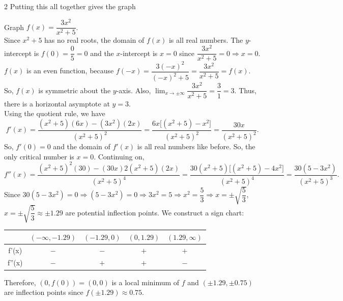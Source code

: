\documentclass{book}
\begin{document}
\begin{Exam}
\begin{multicols}{2}
Putting this all together gives the graph

\begin{center}
\end{center}
\end{multicols}
\end{Exam}\vs

\begin{Exam} Graph $f(x) = \dfrac{3x^2}{x^2+5}$.\\

Since $x^2+5$ has no real roots, the domain of $f(x)$ is all real numbers. The $y$-intercept is $f(0) = \dfrac{0}{5} = 0$ and the $x$-intercept is $x = 0$ since $\dfrac{3x^2}{x^2+5} = 0 \Rightarrow x=0$. $f(x)$ is an even function, because $f(-x) = \dfrac{3(-x)^2}{(-x)^2+5} = \dfrac{3x^2}{x^2+5} = f(x)$. So, $f(x)$ is symmetric about the $y$-axis. Also, $\displaystyle\lim_{x\to \pm\infty} \dfrac{3x^2}{x^2+5} = \dfrac{3}{1} = 3$. Thus, there is a horizontal asymptote at $y=3$.\\

Using the quotient rule, we have \[f'(x) = \dfrac{(x^2+5)(6x) - (3x^2)(2x)}{(x^2+5)^2} = \dfrac{6x\big[(x^2+5) - x^2\big]}{(x^2+5)^2} = \dfrac{30x}{(x^2+5)^2}.\] So, $f'(0) = 0$ and the domain of $f'(x)$ is all real numbers like before. So, the only critical number is $x = 0$. Continuing on, \[f''(x) = \dfrac{(x^2+5)^2(30) - (30x)2(x^2+5)(2x)}{(x^2+5)^4} = \dfrac{30(x^2+5)\big[(x^2+5)-4x^2\big]}{(x^2+5)^4} = \dfrac{30(5-3x^2)}{(x^2+5)^3}.\] Since $30(5-3x^2) = 0 \Rightarrow (5-3x^2) = 0 \Rightarrow 3x^2 = 5 \Rightarrow x^2 = \dfrac{5}{3} \Rightarrow x = \pm\sqrt{\dfrac{5}{3}}$,\; $x = \pm\sqrt{\dfrac{5}{3}} \approx \pm 1.29$ are potential inflection points. We construct a sign chart:

\begin{center}
\begin{tabular}{c|c|c|c|c}

 & $(-\infty, -1.29)$ & $(-1.29, 0)$ & $(0, 1.29)$ & $(1.29, \infty)$ \\ \hline
f'(x) & $-$ & $-$ & $+$ & $+$ \\ 
f''(x) & $-$ & $+$ & $+$ & $-$ \\ 
\end{tabular}
\end{center}\vspace{0.1 in} Therefore, $(0, f(0)) = (0,0)$ is a local minimum of $f$ and $(\pm 1.29, \pm 0.75)$ are inflection points since $f(\pm 1.29) \approx 0.75$. \\


\end{Exam}
\end{document}
